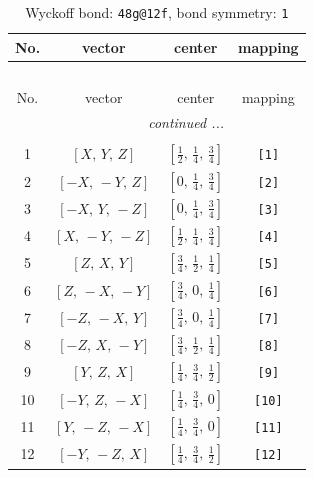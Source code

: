 \documentclass[fleqn,8pt]{jsarticle}
\begin{document}
\begin{longtable}{cccc}
\caption{Wyckoff bond: {\tt 48g@12f}, bond symmetry: {\tt 1}}
 \\
 \hline \hline
No. & vector & center & mapping \\ \hline \endfirsthead

\multicolumn{3}{l}{\tablename\ \thetable{}} \\
 \hline \hline
No. & vector & center & mapping \\ \hline \endhead

 \hline \hline
\multicolumn{3}{r}{\footnotesize\it continued ...} \\ \endfoot

 \hline \hline
\multicolumn{3}{r}{} \\ \endlastfoot

1 & $\left[ X,\, Y,\, Z \right]$ & $\left[ \frac{1}{2},\, \frac{1}{4},\, \frac{3}{4} \right]$ & {\tt [1]} \\ \hline
2 & $\left[ - X,\, - Y,\, Z \right]$ & $\left[ 0,\, \frac{1}{4},\, \frac{3}{4} \right]$ & {\tt [2]} \\ \hline
3 & $\left[ - X,\, Y,\, - Z \right]$ & $\left[ 0,\, \frac{1}{4},\, \frac{3}{4} \right]$ & {\tt [3]} \\ \hline
4 & $\left[ X,\, - Y,\, - Z \right]$ & $\left[ \frac{1}{2},\, \frac{1}{4},\, \frac{3}{4} \right]$ & {\tt [4]} \\ \hline
5 & $\left[ Z,\, X,\, Y \right]$ & $\left[ \frac{3}{4},\, \frac{1}{2},\, \frac{1}{4} \right]$ & {\tt [5]} \\ \hline
6 & $\left[ Z,\, - X,\, - Y \right]$ & $\left[ \frac{3}{4},\, 0,\, \frac{1}{4} \right]$ & {\tt [6]} \\ \hline
7 & $\left[ - Z,\, - X,\, Y \right]$ & $\left[ \frac{3}{4},\, 0,\, \frac{1}{4} \right]$ & {\tt [7]} \\ \hline
8 & $\left[ - Z,\, X,\, - Y \right]$ & $\left[ \frac{3}{4},\, \frac{1}{2},\, \frac{1}{4} \right]$ & {\tt [8]} \\ \hline
9 & $\left[ Y,\, Z,\, X \right]$ & $\left[ \frac{1}{4},\, \frac{3}{4},\, \frac{1}{2} \right]$ & {\tt [9]} \\ \hline
10 & $\left[ - Y,\, Z,\, - X \right]$ & $\left[ \frac{1}{4},\, \frac{3}{4},\, 0 \right]$ & {\tt [10]} \\ \hline
11 & $\left[ Y,\, - Z,\, - X \right]$ & $\left[ \frac{1}{4},\, \frac{3}{4},\, 0 \right]$ & {\tt [11]} \\ \hline
12 & $\left[ - Y,\, - Z,\, X \right]$ & $\left[ \frac{1}{4},\, \frac{3}{4},\, \frac{1}{2} \right]$ & {\tt [12]} \\ \hline

\end{longtable}
\end{document}
